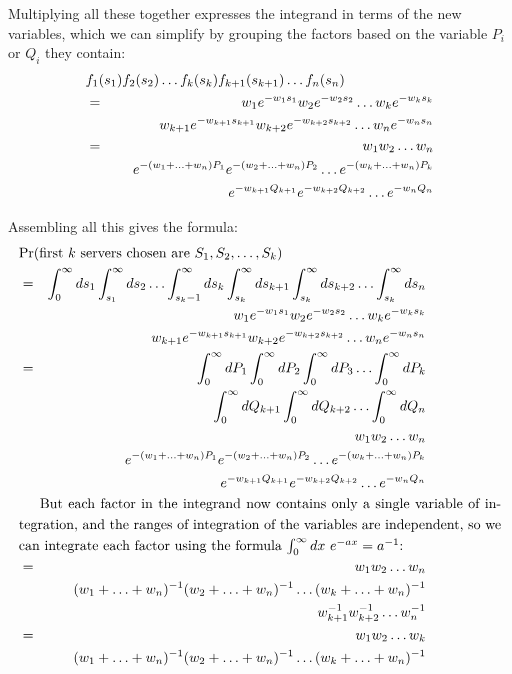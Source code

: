 Multiplying all these together expresses the integrand in terms of the
new variables, which we can
simplify by grouping the factors based on the variable $P_i$ or $Q_i$
they contain:
\begin{eqnarray}
\lefteqn{f_1(s_1) f_2(s_2) \ldots f_k(s_k) f_{k+1}(s_{k+1}) \ldots
  f_n(s_n)} \nonumber \\
&=& w_1 e^{- w_1 s_1} w_2 e^{- w_2 s_2} \ldots w_k e^{- w_k s_k} \nonumber \\
&& \ \ \ \   w_{k+1} e^{- w_{k+1} s_{k+1}} w_{k+2} e^{- w_{k+2} s_{k+2}} \ldots
  w_n e^{- w_n s_n} \\
&=& w_1 w_2 \ldots w_n \nonumber \\
&& \ \ \ \  e^{-(w_1 + \ldots + w_n) P_1} e^{-(w_2 + \ldots + w_n) P_2} \ldots
e^{-(w_k + \ldots + w_n) P_k} \nonumber \\
&& \ \ \ \  e^{-w_{k+1} Q_{k+1}} e^{-w_{k+2} Q_{k+2}} \ldots e^{-w_n Q_n}
\end{eqnarray}

Assembling all this gives the formula:
\begin{eqnarray}
\lefteqn{\Pr{first $k$ servers chosen are $S_1, S_2, \ldots, S_{k}$}} \nonumber \\
&=& \int_0^\infty ds_1
  \int_{s_1}^\infty ds_2 \ldots
  \int_{s_k-1}^\infty ds_k 
  \int_{s_k}^\infty ds_{k+1} \int_{s_k}^\infty ds_{k+2} \ldots
  \int_{s_k}^\infty ds_n \nonumber \\
&& w_1 e^{- w_1 s_1} w_2 e^{- w_2 s_2} \ldots w_k e^{- w_k s_k} \nonumber \\
&& \ \ \ \   w_{k+1} e^{- w_{k+1} s_{k+1}} w_{k+2} e^{- w_{k+2} s_{k+2}} \ldots
  w_n e^{- w_n s_n} \nonumber \\
&=& \int_0^\infty dP_1
\int_0^\infty dP_2
\int_0^\infty dP_3
\ldots
\int_0^\infty dP_k \nonumber \\
&& \ \ \ \ 
\int_0^\infty dQ_{k+1}
\int_0^\infty dQ_{k+2} \ldots
\int_0^\infty dQ_n \nonumber \\
&& \ \ \ \ \ \ \ \  w_1 w_2 \ldots w_n \nonumber \\
&& \ \ \ \ \ \ \ \  
e^{-(w_1 + \ldots + w_n) P_1}
e^{-(w_2 + \ldots + w_n) P_2}
\ldots
e^{-(w_k + \ldots + w_n) P_k} \nonumber \\
&& \ \ \ \ \ \ \ \  e^{-w_{k+1} Q_{k+1}}
e^{-w_{k+2} Q_{k+2}}
\ldots
e^{-w_n Q_n} \\
\noalign{But each factor in the integrand now contains only a single variable of
integration, and
the ranges of integration of the variables are independent, so we can
integrate each factor using the formula $\int_0^\infty dx \  e^{-ax} =
a^{-1}$:}
&=& w_1 w_2 \ldots w_n \nonumber \\
&& (w_1 + \ldots + w_n)^{-1}
(w_2 + \ldots + w_n)^{-1}
\ldots
(w_k + \ldots + w_n)^{-1} \nonumber \\
&& w_{k+1}^{-1}
w_{k+2}^{-1}
\ldots
w_n^{-1} \nonumber \\
&=& w_1 w_2 \ldots w_k \nonumber \\
&& (w_1 + \ldots + w_n)^{-1}
(w_2 + \ldots + w_n)^{-1}
\ldots
(w_k + \ldots + w_n)^{-1}
\end{eqnarray}

